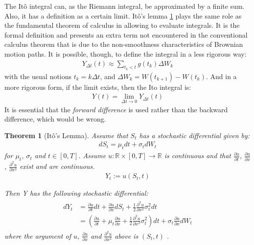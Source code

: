 \documentclass[12pt,twoside]{reedthesis}
\newtheorem{theorem}{Theorem}[section]
\theoremstyle{definition}
\theoremstyle{definition}
\theoremstyle{remark}
\begin{document}
  The Itô integral can, as the Riemann integral, be approximated by a
  finite sum. Also, it has a definition as a certain limit. Itô's lemma
  \ref{itolemma} plays the same role as the fundamental theorem of
  calculus in allowing to evaluate integrals. It is the formal definition
  and presents an extra term not encountered in the conventional calculus
  theorem that is due to the non-smoothness characteristics of Brownian
  motion paths. It is possible, though, to define the integral in a less
  rigorous way:
  \begin{align}
  Y_{\Delta t}(t) \approx \sum_{t_k < t}{g(t_k)\Delta W_k}
  \end{align}
  \noindent
  with the usual notions \(t_k = k\Delta t\), and
  \(\Delta W_k = W(t_{k+1})-W(t_k)\). And in a more rigorous form, if the
  limit exists, then the Ito integral is:
  \begin{align}
  Y(t)  = \lim\limits_{\Delta t \to 0} Y_{\Delta t}(t)
  \end{align}
  It is essential that the \emph{forward difference} is used rather than
  the backward difference, which would be wrong.
  \begin{theorem}[Itô's Lemma] \label{itolemma}
  Assume that $S_t$ has a stochastic differential given by:
  \begin{align}
  dS_t = \mu_t dt + \sigma_t dW_t 
  \end{align}
  \noindent
  for $\mu_t$, $\sigma_t$ and $t \in [0,T]$. Assume $u: \mathbb{R} \times [0, T] \rightarrow \mathbb{R}$ is continuous and that $\frac{\partial u}{\partial t}$, $\frac{\partial u}{\partial x}$, $\frac{\partial^2 u}{\partial x^2}$ exist and are continuous.
  \begin{align*}
  Y_t := u(S_t, t)
  \end{align*}
  
  \noindent
  Then Y has the following stochastic differential:
  \begin{align} 
  \label{eq:ito}
  \begin{split}
      dY_t &= \frac{\partial u}{\partial t}dt + \frac{\partial u}{\partial x} dS_t + \frac{1}{2}\frac{\partial^2 u}{\partial x^2}\sigma_t^2 dt  \\[10pt] 
      &= \left( \frac{\partial u}{\partial t} + \mu_t \frac{\partial u}{\partial x} + \frac{1}{2}\frac{\partial^2 u}{\partial x^2}\sigma_t^2 \right) dt + \sigma_t \frac{\partial u}{\partial x} dW_t
  \end{split}
  \end{align}
  \noindent 
  where the argument of $u$, $\frac{\partial u}{\partial x}$ and $\frac{\partial^2 u}{\partial x^2}$ above is $\left( S_t, t \right)$ .
  \end{theorem}
\end{document}
